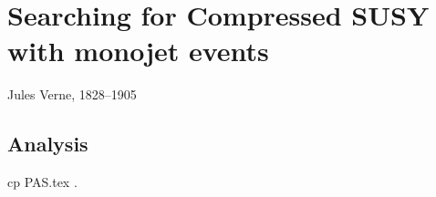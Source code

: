 \chapter{Searching for Compressed SUSY with monojet events}
\label{chap:sus13009}

{Jules Verne, 1828--1905}

\section{Analysis}
cp PAS.tex .
